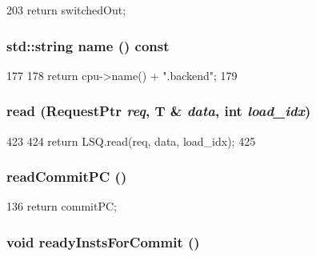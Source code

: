 \begin{DoxyCode}
203 { return switchedOut; }
\end{DoxyCode}
\hypertarget{classLWBackEnd_a37627d5d5bba7f4a8690c71c2ab3cb07}{
\subsubsection[{name}]{\setlength{\rightskip}{0pt plus 5cm}std::string name () const}}
\label{classLWBackEnd_a37627d5d5bba7f4a8690c71c2ab3cb07}



\begin{DoxyCode}
177 {
178     return cpu->name() + ".backend";
179 }
\end{DoxyCode}
\hypertarget{classLWBackEnd_a0747777ac998dabdc20fa0c554d378d3}{
\subsubsection[{read}]{ read ({\bf RequestPtr} {\em req}, \/  T \& {\em data}, \/  int {\em load\_\-idx})}}
\label{classLWBackEnd_a0747777ac998dabdc20fa0c554d378d3}



\begin{DoxyCode}
423 {
424     return LSQ.read(req, data, load_idx);
425 }
\end{DoxyCode}
\hypertarget{classLWBackEnd_aa28f3fe58fde4b038a92b9f87a40cb10}{
\subsubsection[{readCommitPC}]{ readCommitPC ()}}
\label{classLWBackEnd_aa28f3fe58fde4b038a92b9f87a40cb10}



\begin{DoxyCode}
136 { return commitPC; }
\end{DoxyCode}
\hypertarget{classLWBackEnd_aaf16f1d27dc8f5db83c4d2b981a100a9}{
\subsubsection[{readyInstsForCommit}]{\setlength{\rightskip}{0pt plus 5cm}void readyInstsForCommit ()}}
\label{classLWBackEnd_aaf16f1d27dc8f5db83c4d2b981a100a9}



